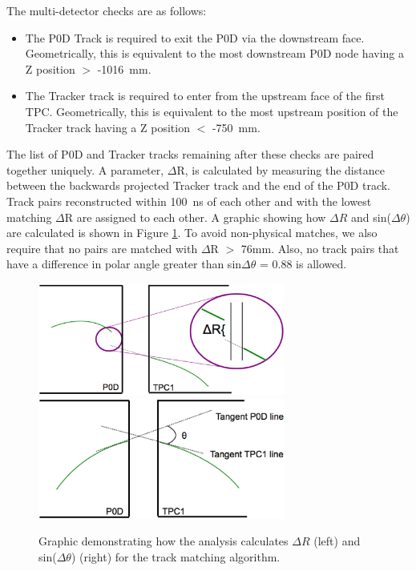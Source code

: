 The multi-detector checks are as follows:
\begin{itemize}
\item The P0D Track is required to exit the P0D via the downstream face. Geometrically, this is equivalent to the most downstream P0D node having a Z position $>$ -1016~mm.
\item The Tracker track is required to enter from the upstream face of the first TPC. Geometrically, this is equivalent to the most upstream position of the Tracker track having a Z position $<$ -750~mm.
\end{itemize}

The list of P0D and Tracker tracks remaining after these checks are paired together uniquely. A parameter, $\Delta$R, is calculated by measuring the distance between the backwards projected Tracker track and the end of the P0D track. Track pairs reconstructed within 100~ns of each other and with the lowest matching $\Delta$R are assigned to each other. A graphic showing how $\Delta R$ and sin($\Delta \theta$) are calculated is shown in Figure \ref{fig:dRCalc}. To avoid non-physical matches, we also require that no pairs are matched with $\Delta$R $>$ 76mm. Also, no track pairs that have a difference in polar angle greater than sin$\Delta\theta$ = 0.88 is allowed.

\begin{figure}
\begin{center}
\includegraphics[width=3.2in]{Figures/drCalc.eps}
\includegraphics[width=3.2in]{Figures/sindThetaCalc.eps}
\end{center}
\caption{Graphic demonstrating how the analysis calculates $\Delta R$ (left) and sin($\Delta \theta$) (right) for the track matching algorithm.}
\label{fig:dRCalc}
\end{figure}

